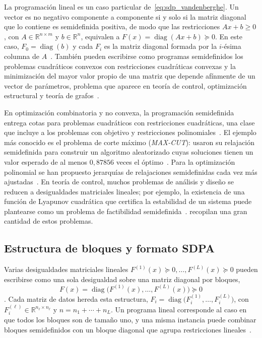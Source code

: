 La programación lineal es un caso particular de~\eqref{eq:sdp_vandenberghe}. Un vector es no
negativo componente a componente si y solo si la matriz diagonal que lo contiene es semidefinida
positiva, de modo que las restricciones $Ax + b \geq 0$, con $A \in \mathbb{R}^{n \times m}$ y
$b \in \mathbb{R}^n$, equivalen a $F(x) = \operatorname{diag}(Ax + b) \succeq 0$. En este caso,
$F_0 = \operatorname{diag}(b)$ y cada $F_i$ es la matriz diagonal formada por la $i$-ésima
columna de $A$~\parencite[p.~50]{vandenbergheSemidefiniteProgramming1996}. También pueden
escribirse como programas semidefinidos los problemas cuadráticos convexos con restricciones
cuadráticas convexas y la minimización del mayor valor propio de una matriz que depende
afínmente de un vector de parámetros, problema que aparece en teoría de control, optimización
estructural y teoría de grafos~\parencite[p.~54]{vandenbergheSemidefiniteProgramming1996}.

En optimización combinatoria y no convexa, la programación semidefinida entrega cotas para
problemas cuadráticos con restricciones cuadráticas, una clase que incluye a los problemas con
objetivo y restricciones polinomiales~\parencite[pp.~59--60]{vandenbergheSemidefiniteProgramming1996}.
El ejemplo más conocido es el problema de corte máximo (\textit{MAX-CUT}):
\textcite{goemansImprovedApproximationAlgorithms1995} usaron su relajación semidefinida para
construir un algoritmo aleatorizado cuyas soluciones tienen un valor esperado de al menos
$0{,}87856$ veces el óptimo~\parencite[p.~1115]{goemansImprovedApproximationAlgorithms1995}. Para
la optimización polinomial se han propuesto jerarquías de relajaciones semidefinidas cada vez más
ajustadas~\parencite{lasserreGlobalOptimizationPolynomials2001,parriloSemidefiniteProgrammingRelaxations2003}.
En teoría de control, muchos problemas de análisis y diseño se reducen a desigualdades
matriciales lineales; por ejemplo, la existencia de una función de Lyapunov cuadrática que
certifica la estabilidad de un sistema puede plantearse como un problema de factibilidad
semidefinida~\parencite[pp.~61--62]{vandenbergheSemidefiniteProgramming1996}.
\textcite{boydLinearMatrixInequalities1994} recopilan una gran cantidad de estos problemas.

\subsection{Estructura de bloques y formato SDPA}
\label{subsec:sdp_bloques}

Varias desigualdades matriciales lineales $F^{(1)}(x) \succeq 0, \ldots, F^{(L)}(x) \succeq 0$
pueden escribirse como una sola desigualdad sobre una matriz diagonal por bloques,
\[
    F(x) = \operatorname{diag}\bigl(F^{(1)}(x), \ldots, F^{(L)}(x)\bigr) \succeq 0
\]
\parencite[p.~51]{vandenbergheSemidefiniteProgramming1996}. Cada matriz de datos hereda esta
estructura, $F_i = \operatorname{diag}\bigl(F_i^{(1)}, \ldots, F_i^{(L)}\bigr)$, con
$F_i^{(\ell)} \in \mathbb{R}^{n_\ell \times n_\ell}$ y $n = n_1 + \cdots + n_L$. Un programa
lineal corresponde al caso en que todos los bloques son de tamaño uno, y una misma instancia
puede combinar bloques semidefinidos con un bloque diagonal que agrupa restricciones
lineales~\parencite{SDPAFormat}.

